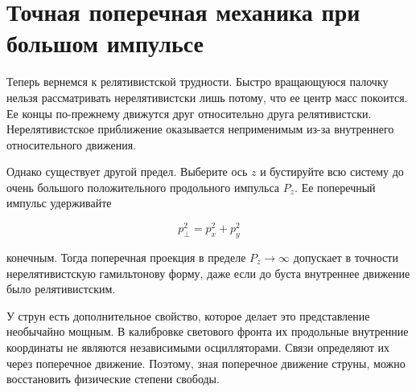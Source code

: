 \section{Точная поперечная механика при большом импульсе}

Теперь вернемся к релятивистской трудности. Быстро вращающуюся палочку нельзя рассматривать нерелятивистски лишь потому, что ее центр масс покоится. Ее концы по-прежнему движутся друг относительно друга релятивистски. Нерелятивистское приближение оказывается неприменимым из-за внутреннего относительного движения.

Однако существует другой предел. Выберите ось \(z\) и бустируйте всю систему до очень большого положительного продольного импульса \(P_z\). Ее поперечный импульс удерживайте

\begin{equation}
  p_\perp^2=p_x^2+p_y^2
\end{equation}

конечным. Тогда поперечная проекция в пределе \(P_z\to\infty\) допускает в точности нерелятивистскую гамильтонову форму, даже если до буста внутреннее движение было релятивистским.

\begin{classroomqa}
\end{classroomqa}

\begin{classroomqa}
\end{classroomqa}

У струн есть дополнительное свойство, которое делает это представление необычайно мощным. В калибровке светового фронта их продольные внутренние координаты не являются независимыми осцилляторами. Связи определяют их через поперечное движение. Поэтому, зная поперечное движение струны, можно восстановить физические степени свободы.

